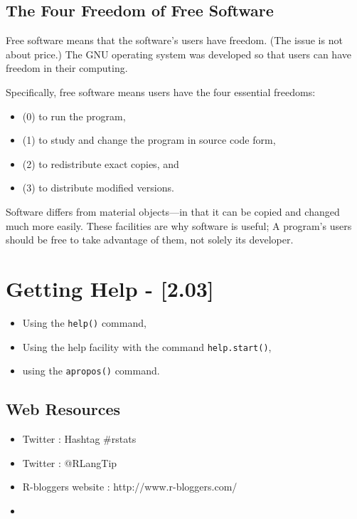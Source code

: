 \newpage
\subsection*{The Four Freedom of Free Software}
Free software means that the software's users have freedom. (The issue is not about price.) The GNU operating system was developed so that users can have freedom in their computing.

Specifically, free software means users have the four essential freedoms: 
\begin{itemize}
\item(0) to run the program, 
\item(1) to study and change the program in source code form, 
\item(2) to redistribute exact copies, and 
\item(3) to distribute modified versions.
\end{itemize}

Software differs from material objects—in that it can be copied and changed much more easily. These facilities are why software is useful; A program's users should be free to take advantage of them, not solely its developer.




\newpage
\section*{Getting Help - [2.03]}

\begin{itemize}
\item Using the \texttt{help()} command,
\item Using the help facility with the command \texttt{help.start()},
\item using the \texttt{apropos()} command.
\end{itemize}

\subsection*{Web Resources}
\begin{itemize}
\item Twitter : Hashtag \#rstats
\item Twitter : @RLangTip
\item R-bloggers website : http://www.r-bloggers.com/
\item 
\end{itemize}
\newpage
